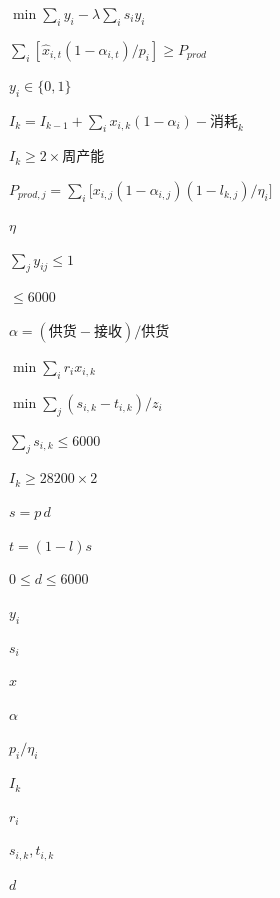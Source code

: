 
$\min \sum_i y_i-\lambda\sum_i s_i y_i$

$\sum_i [\hat x_{i,t}(1-\alpha_{i,t})/p_i]\ge P_{prod}$

$y_i\in\{0,1\}$

$I_k=I_{k-1}+\sum_i x_{i,k}(1-\alpha_i)-\text{消耗}_k$

$I_k\ge 2\times\text{周产能}$

$P_{prod,j}=\sum_i\big[x_{i,j}(1-\alpha_{i,j})(1-l_{k,j})/\eta_i\big]$

$\eta$

$\sum_j y_{ij}\le1$

$\le6000$

$\alpha=(\text{供货}-\text{接收})/\text{供货}$

$\min\sum_i r_i x_{i,k}$

$\min\sum_j (s_{i,k}-t_{i,k})/z_i$

$\sum_j s_{i,k}\le6000$

$I_k\ge28200\times2$

$s=p\,d$

$t=(1-l)s$

$0\le d\le6000$

$y_i$

$s_i$

$\hat x$

$\alpha$

$p_i/\eta_i$

$I_k$

$r_i$

$s_{i,k},t_{i,k}$

$d$
